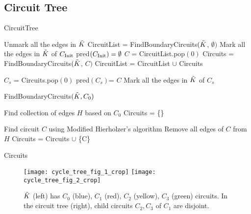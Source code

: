 \subsection{Circuit Tree}

\begin{algorithm}[htp!] 
	\caption{CircuitTree}
	\label{alg:circuittree}
	\begin{algorithmic}[1]
		\State Unmark all the edges in $\tilde{K}$
		\State CircuitList =  FindBoundaryCircuits$(\tilde{K}$, $\emptyset)$
		\State Mark all the edges in $\tilde{K}$ of $C_{\rm Init}$
		\State pred$(C_{\rm Init}) = \emptyset$ 
		\State $C$ = CircuitList.pop$(0)$ 
		\State Circuits = FindBoundaryCircuits$(\tilde{K}$, $C)$ 
		\State CircuitList = CircuitList $\cup$ Circuits
		
		
		\State $C_s$ = Circuits.pop$(0)$ 
		\State pred$(C_s)$= $C$ 
		\State Mark all the edges in $\tilde{K}$ of $C_s$
		
		\EndWhile
		  	
		\EndWhile
	\end{algorithmic}
\end{algorithm}

\begin{algorithm}[htp!] 
	\caption{FindBoundaryCircuits$(\tilde{K},C_0)$}
	\label{alg:findboundarycircuit}
	\begin{algorithmic}[1]
	\State Find collection of edges $H$ based on $C_0$ 
	\State Circuits = \{\}	
     
     \State Find circuit $C$ using Modified Hierholzer's algorithm
     \State Remove all edges of $C$ from $H$
     \State Circuits = Circuits $\cup$ \{C\}
     
     \EndWhile			
	
	\State \Return Circuits
	\end{algorithmic}
	
\end{algorithm}

\begin{figure}[htp!] 
  \centering
  \vspace*{-0.1in}
	\texttt{[image: cycle\_tree\_fig\_1\_crop]}
	\texttt{[image: cycle\_tree\_fig\_2\_crop]}
	\caption{
          $\tilde{K}$ (left) has $C_0$ (blue), $C_1$ (red), $C_2$ (yellow), $C_3$ (green) circuits.
          In the circuit tree (right), child circuits $C_2, C_3$  of $C_1$ are disjoint.
          }
	\label{fig:circuittree}
        \vspace*{-0.1in}
\end{figure}

